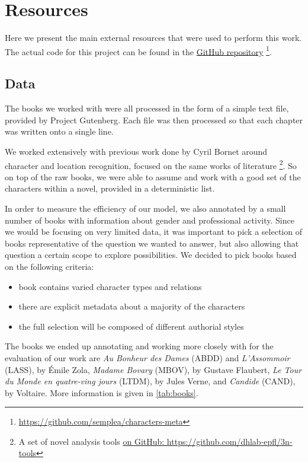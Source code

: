 \section{Resources}
Here we present the main external resources that were used to perform this work. The actual code for this project can be found in the \href{https://github.com/semplea/characters-meta}{GitHub repository} \footnote{\href{https://github.com/semplea/characters-meta}{https://github.com/semplea/characters-meta}}.

\subsection{Data} \label{ssec:data}
The books we worked with were all processed in the form of a simple text file, provided by Project Gutenberg. Each file was then processed so that each chapter was written onto a single line.

We worked extensively with previous work done by Cyril Bornet around character and location recognition, focused on the same works of literature \footnote{A set of novel analysis tools \href{https://github.com/dhlab-epfl/3n-tools}{on GitHub: https://github.com/dhlab-epfl/3n-tools}}. So on top of the raw books, we were able to assume and work with a good set of the characters within a novel, provided in a deterministic list.

In order to measure the efficiency of our model, we also annotated by a small number of books with information about gender and professional activity. Since we would be focusing on very limited data, it was important to pick a selection of books representative of the question we wanted to answer, but also allowing that question a certain scope to explore possibilities. We decided to pick books based on the following criteria:
\begin{itemize}
\item book contains varied character types and relations 
\item there are explicit metadata about a majority of the characters
\item the full selection will be composed of different authorial styles 
\end{itemize}

The books we ended up annotating and working more closely with for the evaluation of our work are \textit{Au Bonheur des Dames} (ABDD) and \textit{L'Assommoir} (LASS), by Émile Zola, \textit{Madame Bovary} (MBOV), by Gustave Flaubert, \textit{Le Tour du Monde en quatre-ving jours} (LTDM), by Jules Verne, and \textit{Candide} (CAND), by Voltaire. More information is given in \cref{tab:books}. 

